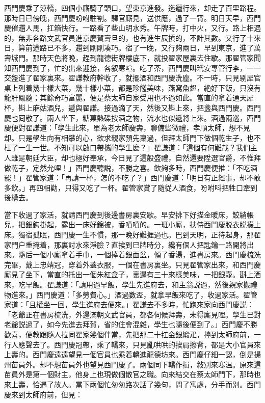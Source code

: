 西門慶乘了涼轎，四個小廝騎了頭口，望東京進發。迤邐行來，却走了百里路程。那時日已傍晚，西門慶吩咐駐劄。驛官廝見，送供應，過了一宵。明日天早，西門慶催趲人馬，扛箱快行。一路看了些山明水秀。午牌時，打中火，又行。路上相遇的，無非各路文武官員進京慶賀壽旦的，也有進生辰摃的，不計其數。又行了十來日，算前途路已不多，趲到剛剛凑巧。宿了一晚，又行夠兩日，早到東京，進了萬壽城門。那時天色將晚，趕到龍德街牌樓底下，就投翟家屋裏去住歇。那翟管家聞知西門慶到了，忙的出來迎接，各叙寒喧。吃了茶，西門慶叫玳安專管行李，一一交盤進了翟家裏來。翟謙教府幹收了，就擺酒和西門慶洗塵。不一時，只見剔犀官桌上列着幾十樣大菜，幾十樣小菜，都是珍饈美味，燕窝魚翅，絶好下飯，只沒有龍肝鳳髓；其餘奇巧富麗，便是蔡太師自家受用也不過如此。當直的拿着通天犀杯，斟上麻姑酒兒，遞與翟謙。接過滴了天，然後又斟上來，把盞與西門慶。西門慶也囘敬了。兩人坐下，糖菓熱碟按酒之物，流水也似遞將上來。酒過兩巡，西門慶便對翟謙道：「學生此來，單為老太師慶壽，聊備些微禮，孝順太師，想不見却。只是學生向有相攀的心，欲求親家預先稟過，但拜太師門下做個乾生子，也不枉了一生一世。不知可以啟口帶攜的學生麽？」翟謙道：「這個有何難哉？我們主人雖是朝廷大臣，却也極好奉承，今日見了這般盛禮，自然還要陞選官爵，不惟拜做乾子，定然允哩！」西門慶聽説，不勝之喜。飲夠多時，西門慶便推：「不吃酒罷！」翟管家道：「再請一杯，怎的不吃了？」西門慶道：「明日有正經事，却不敢多飲。」再四相勸，只得又吃了一杯。翟管家賞了隨従人酒食，吩咐呌把牲口牽到後槽去。

當下收過了家活，就請西門慶到後邊書房裏安歇。早安排下好描金暖床，鮫綃帳兒，把銀鈎掛起，露出一床好錦被，香噴噴的。一班小廝，扶侍西門慶脱衣脱襪上床。獨宿孤眠，西門慶一生不慣，那一晚好難捱過也。巴到天明，正待起身，那翟家門户重掩着，那裏討水來淨臉？直挨到巳牌時分，纔有個人把匙鑰一路開將出來。隨后一個小廝拿着手巾，一個捧着銀面盆，傾了香湯，進書房來。西門慶梳洗完畢，戴上忠靖冠，穿着外蓋衣服，一個在書房裏坐。只見翟管家出來，和西門慶廝見了坐下，當直的托出一個朱紅盒子，裏邊有三十來樣美味，一把銀壺。斟上酒來，吃早飯。翟謙道：「請用過早飯，學生先進府去，和主翁説過，然後親家搬禮物進來。」西門慶道：「多勞費心。」酒過數盃，就拿早飯來吃了，收過家活。翟管家道：「且權坐一回，學生進府去便來。」翟謙去不多時，忙跑來家向西門慶説：「老爺正在書房梳洗，外邊滿朝文武官員，都各伺候拜壽，未得廝見哩。學生已對老爺説過了，如今先進去拜賀，省的住會混雜，學生也隨後便到了。」西門慶不勝歡喜，便教跟隨人拉同翟家幾個伴當，先把那二十扛金銀緞疋，擡到太師府前，一行人應聲去了。西門慶冠帶，乘了轎來，只見亂哄哄的挨肩擦背，都是大小官員來上壽的。西門慶遠遠望見一個官員也乘着轎進龍德坊來。西門慶仔細一認，倒是揚州苗員外。却不想苗員外也望見西門慶了。兩個同下轎作揖，敍別來寒温。原來這苗員外是第一個財主，他身上也現做個散官之職。向來結交在蔡太師門下，那時也來上壽，恰遇了故人。當下兩個忙匆匆路次話了幾句，問了寓處，分手而别。西門慶來到太師府前，但見：

